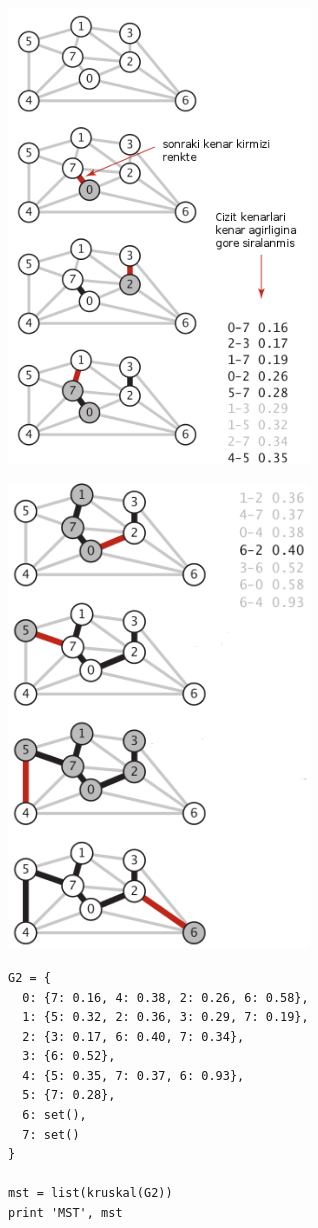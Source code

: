 \documentclass[12pt,fleqn]{article}\usepackage{../../common}
\begin{document}
\includegraphics[width=8cm]{sedge_krus_1.png}

\includegraphics[width=8cm]{sedge_krus_2.png}

\begin{verbatim}
G2 = {
  0: {7: 0.16, 4: 0.38, 2: 0.26, 6: 0.58},
  1: {5: 0.32, 2: 0.36, 3: 0.29, 7: 0.19},
  2: {3: 0.17, 6: 0.40, 7: 0.34},
  3: {6: 0.52},
  4: {5: 0.35, 7: 0.37, 6: 0.93},
  5: {7: 0.28},
  6: set(),
  7: set()
} 

mst = list(kruskal(G2))
print 'MST', mst
\end{verbatim}
\end{document}
